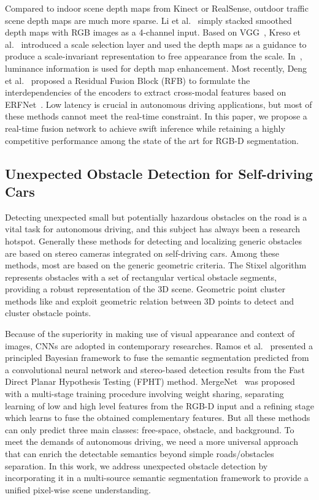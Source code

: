 \documentclass[letterpaper, 10 pt, journal, twoside]{ieeetran}
\begin{document}
Compared to indoor scene depth maps from Kinect or RealSense, outdoor traffic scene depth maps are much more sparse. Li et al.~\cite{li2017traffic} simply stacked smoothed depth maps with RGB images as a 4-channel input.
Based on VGG~\cite{vgg}, Kreso et al.~\cite{krevso2016convolutional} introduced a scale selection layer and used the depth maps as a guidance to produce a scale-invariant representation to free appearance from the scale.
In~\cite{hung2019incorporating}, luminance information is used for depth map enhancement. Most recently, Deng et al.~\cite{deng2019rfbnet} proposed a Residual Fusion Block (RFB) to formulate the interdependencies of the encoders to extract cross-modal features based on ERFNet~\cite{romera2017erfnet}. Low latency is crucial in autonomous driving applications, but most of these methods cannot meet the real-time constraint. In this paper, we propose a real-time fusion network to achieve swift inference while retaining a highly competitive performance among the state of the art for RGB-D segmentation.

\subsection{Unexpected Obstacle Detection for Self-driving Cars}

Detecting unexpected small but potentially hazardous obstacles on the road is a vital task for autonomous driving, and this subject has always been a research hotspot. Generally these methods for detecting and localizing generic obstacles are based on stereo cameras integrated on self-driving cars. Among these methods, most are based on the generic geometric criteria. The Stixel algorithm \cite{pfeiffer2011towards} represents obstacles with a set of rectangular vertical obstacle segments, providing a robust representation of the 3D scene. Geometric point cluster methods like \cite{manduchi2005obstacle} and \cite{broggi2011stereo} exploit geometric relation between 3D points to detect and cluster obstacle points.

Because of the superiority in making use of visual appearance and context of images, CNNs are adopted in contemporary researches. Ramos et al.~\cite{ramos2017detecting} presented a principled Bayesian framework to fuse the semantic segmentation predicted from a convolutional neural network and stereo-based detection results from the Fast Direct Planar Hypothesis Testing (FPHT) method. MergeNet~\cite{gupta2018mergenet} was proposed with a multi-stage training procedure involving weight sharing, separating learning of low and high level features from the RGB-D input and a refining stage which learns to fuse the obtained complementary features. But all these methods can only predict three main classes: free-space, obstacle, and background. To meet the demands of autonomous driving, we need a more universal approach that can enrich the detectable semantics beyond simple roads/obstacles separation. In this work, we address unexpected obstacle detection by incorporating it in a multi-source semantic segmentation framework to provide a unified pixel-wise scene understanding.
\end{document}
